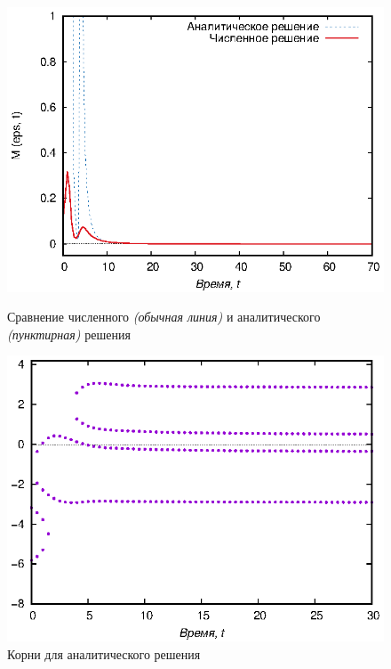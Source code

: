 \documentclass[14pt, a4paper]{article}
\numberwithin{figure}{section}
\numberwithin{equation}{section}
\begin{document}
\begin{figure}[h]
	\begin{center}
		\begin{minipage}[h]{0.45\linewidth}
			\includegraphics[width=1\linewidth]{full2}
			\caption{Сравнение численного \textit{(обычная линия)} и аналитического \textit{(пунктирная)} решения} %
			\label{ris:full2} %
		\end{minipage}
		\hfill 
		\begin{minipage}[h]{0.45\linewidth}
			\includegraphics[width=1\linewidth]{rootsend2}
			\caption{Корни для аналитического решения }
			\label{ris:rootsend2}
		\end{minipage}
	\end{center}
\end{figure}
\end{document}
